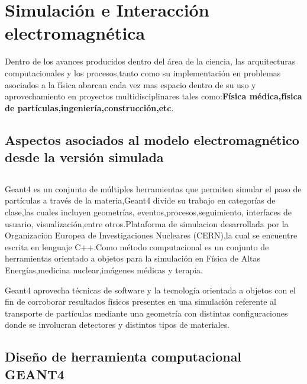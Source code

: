 \documentclass[12pt,fleqn]{book} %
\numberwithin{equation}{section} %
\numberwithin{figure}{section} %
\numberwithin{table}{section} %
\begin{document}
{ %

\chapter{Simulación e  Interacción electromagnética}

Dentro de los avances producidos dentro del área de la ciencia, las arquitecturas computacionales y los procesos,tanto como su implementación en problemas asociados a la física abarcan cada vez mas espacio dentro de su uso y aprovechamiento en proyectos multidisciplinares tales como:\textbf{Física médica,física de partículas,ingeniería,construcción,etc}.

\section{Aspectos asociados al modelo electromagnético desde la versión simulada}



\section{}
\section{}

Geant4 es un conjunto de  múltiples herramientas que permiten simular el paso de partículas a través de la materia,Geant4 divide su trabajo en categorías de clase,las cuales incluyen geometrías, eventos,procesos,seguimiento, interfaces de usuario, visualización,entre otros.Plataforma  de  simulacion  desarrollada  por  la  Organizacion Europea de  Investigaciones Nucleares (CERN),la  cual se encuentre escrita  en  lenguaje  C++.Como método computacional es un conjunto de herramientas orientado a objetos para la simulación en Física de Altas Energías,medicina nuclear,imágenes médicas y terapia.
  
Geant4 aprovecha técnicas  de software y la tecnología orientada a objetos con el fin de corroborar resultados físicos presentes en una simulación referente al transporte de partículas mediante una geometría con distintas configuraciones donde se involucran detectores y distintos tipos de materiales.


\newpage
\section{Diseño de herramienta computacional GEANT4}

}
\end{document}
